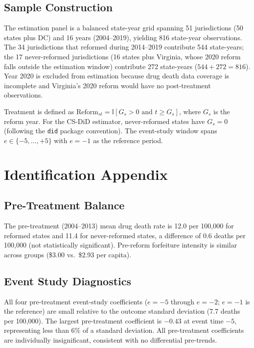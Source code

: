\documentclass[12pt]{article}
\newcommand{\ind}{\mathbb{I}}
\begin{document}
\subsection{Sample Construction}

The estimation panel is a balanced state-year grid spanning 51 jurisdictions (50 states plus DC) and 16 years (2004--2019), yielding 816 state-year observations. The 34 jurisdictions that reformed during 2014--2019 contribute 544 state-years; the 17 never-reformed jurisdictions (16 states plus Virginia, whose 2020 reform falls outside the estimation window) contribute 272 state-years ($544 + 272 = 816$). Year 2020 is excluded from estimation because drug death data coverage is incomplete and Virginia's 2020 reform would have no post-treatment observations.

Treatment is defined as $\text{Reform}_{st} = \ind[G_s > 0 \text{ and } t \geq G_s]$, where $G_s$ is the reform year. For the CS-DiD estimator, never-reformed states have $G_s = 0$ (following the \texttt{did} package convention). The event-study window spans $e \in \{-5, \ldots, +5\}$ with $e = -1$ as the reference period.


\section{Identification Appendix}
\label{app:id}

\subsection{Pre-Treatment Balance}

The pre-treatment (2004--2013) mean drug death rate is 12.0 per 100,000 for reformed states and 11.4 for never-reformed states, a difference of 0.6 deaths per 100,000 (not statistically significant). Pre-reform forfeiture intensity is similar across groups (\$3.00 vs.\ \$2.93 per capita).

\subsection{Event Study Diagnostics}

All four pre-treatment event-study coefficients ($e = -5$ through $e = -2$; $e = -1$ is the reference) are small relative to the outcome standard deviation (7.7 deaths per 100,000). The largest pre-treatment coefficient is $-0.43$ at event time $-5$, representing less than 6\% of a standard deviation. All pre-treatment coefficients are individually insignificant, consistent with no differential pre-trends.
\end{document}
